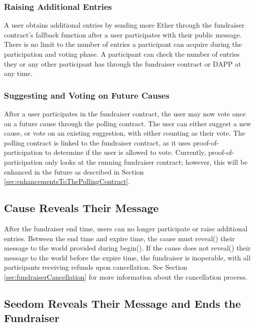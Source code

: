 \documentclass[11pt]{article}
\begin{document}
\subsubsection{Raising Additional Entries}

A user obtains additional entries by sending more Ether through the fundraiser contract's fallback function after a user participates with their public message. There is no limit to the number of entries a participant can acquire during the participation and voting phase. A participant can check the number of entries they or any other participant has through the fundraiser contract or DAPP at any time.

\subsubsection{Suggesting and Voting on Future Causes}

After a user participates in the fundraiser contract, the user may now vote once on a future cause through the polling contract. The user can either suggest a new cause, or vote on an existing suggestion, with either counting as their vote. The polling contract is linked to the fundraiser contract, as it uses proof-of-participation to determine if the user is allowed to vote. Currently, proof-of-participation only looks at the running fundraiser contract; however, this will be enhanced in the future as described in Section \ref{sec:enhancementsToThePollingContract}.

\subsection{Cause Reveals Their Message}

After the fundraiser end time, users can no longer participate or raise additional entries. Between the end time and expire time, the cause must reveal() their message to the world provided during begin(). If the cause does not reveal() their message to the world before the expire time, the fundraiser is inoperable, with all participants receiving refunds upon cancellation. See Section \ref{sec:fundraiserCancellation} for more information about the cancellation process.

\subsection{Seedom Reveals Their Message and Ends the Fundraiser}
\label{sec:seedomRevealsTheirMessageAndEndsTheFundraiser}
\end{document}
